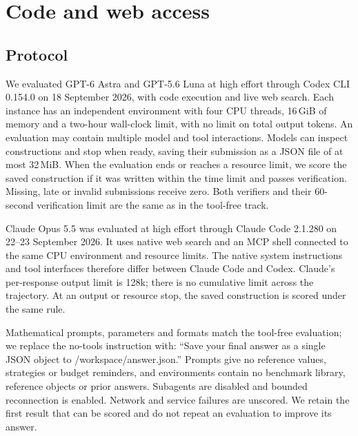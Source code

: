 \appendixpage
\section{Code and web access}
\label{app:tools}

\subsection{Protocol}
We evaluated GPT-6 Astra and GPT-5.6 Luna at high effort through Codex CLI 0.154.0 on 18 September 2026, with code execution and live web search. Each instance has an independent environment with four CPU threads, 16\,GiB of memory and a two-hour wall-clock limit, with no limit on total output tokens. An evaluation may contain multiple model and tool interactions. Models can inspect constructions and stop when ready, saving their submission as a JSON file of at most 32\,MiB. When the evaluation ends or reaches a resource limit, we score the saved construction if it was written within the time limit and passes verification. Missing, late or invalid submissions receive zero. Both verifiers and their 60-second verification limit are the same as in the tool-free track.

Claude Opus 5.5 was evaluated at high effort through Claude Code 2.1.280 on 22--23 September 2026. It uses native web search and an MCP shell connected to the same CPU environment and resource limits. The native system instructions and tool interfaces therefore differ between Claude Code and Codex. Claude's per-response output limit is 128k; there is no cumulative limit across the trajectory. At an output or resource stop, the saved construction is scored under the same rule.

Mathematical prompts, parameters and formats match the tool-free evaluation; we replace the no-tools instruction with: ``Save your final answer as a single JSON object to /workspace/answer.json.'' Prompts give no reference values, strategies or budget reminders, and environments contain no benchmark library, reference objects or prior answers. Subagents are disabled and bounded reconnection is enabled. Network and service failures are unscored. We retain the first result that can be scored and do not repeat an evaluation to improve its answer.

